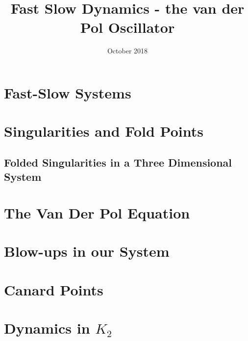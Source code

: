 \documentclass{article}
\title{Fast Slow Dynamics - the van der Pol Oscillator}
\author{}
\date{October 2018}
\begin{document}
\maketitle

\tableofcontents
\newpage
\listoffigures

\newpage
{} %
\pagestyle{fancy}

\begin{abstract}
	
\end{abstract}



\section{Fast-Slow Systems}\label{Intro}


\section{Singularities and Fold Points}\label{sec:singularitiesandfoldpoints}


\subsection{Folded Singularities in a Three Dimensional System}


\section{The Van Der Pol Equation}



\section{Blow-ups in our System}\label{sec: VDP Blowup}


\section{Canard Points}

\newpage 


\nocite{strogatz2007nonlinear}

\newpage
\appendix
\section{Dynamics in \texorpdfstring{$K_2$}{K2}}
\end{document}
